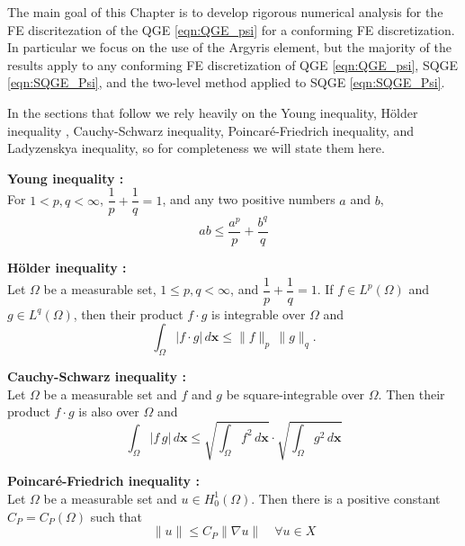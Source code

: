 The main goal of this Chapter is to develop rigorous numerical analysis for
the FE discritezation of the QGE \eqref{eqn:QGE_psi} for a conforming FE
discretization. In particular we focus on the use of the Argyris element, but
the majority of the results apply to any conforming FE discretization of QGE
\eqref{eqn:QGE_psi}, SQGE \eqref{eqn:SQGE_Psi}, and the two-level method applied
to SQGE \eqref{eqn:SQGE_Psi}.

In the sections that follow we rely heavily on the Young inequality, H\"older
inequality , Cauchy-Schwarz inequality, Poincar\'e-Friedrich inequality, and
Ladyzenskya inequality, so for completeness we will state them here.

\begin{definition} \label{def:Young}
  \textbf{Young inequality \cite{Royden2010}:}\\
  For $1 < p,q < \infty$, $\dfrac{1}{p} + \dfrac{1}{q} = 1$, and any two
  positive numbers $a$ and $b$,
  \begin{equation}
    ab \le \frac{a^p}{p} + \frac{b^q}{q}
    \label{eqn:Young}
  \end{equation}
\end{definition}
\begin{definition} \label{def:Holder}
  \textbf{H\"older inequality \cite{Royden2010}:}\\
  Let $\Omega$ be a measurable set, $1\le p,q < \infty$, and $\dfrac{1}{p} +
  \dfrac{1}{q} = 1$. If $f \in L^p(\Omega)$ and $g \in L^q(\Omega)$, then their
  product $f\cdot g$ is integrable over $\Omega$ and
  \begin{equation}
    \int_{\Omega}\! |f\cdot g| \, d\mathbf{x} \le \|f\|_p\, \|g\|_q.
    \label{eqn:Holder}
  \end{equation}
\end{definition}
\begin{definition} \label{def:Cauchy-Schwarz}
  \textbf{Cauchy-Schwarz inequality \cite{Royden2010}:}\\
  Let $\Omega$ be a measurable set and $f$ and $g$ be square-integrable over
  $\Omega$. Then their product $f\cdot g$ is also over $\Omega$ and
  \begin{equation}
    \int_{\Omega}\! |f\,g|\, d\mathbf{x} \le \sqrt{\int_{\Omega}\! f^2 \,
      d\mathbf{x}} \cdot \sqrt{\int_{\Omega}\! g^2 \, d\mathbf{x}}
    \label{eqn:Cauchy}
  \end{equation}

\end{definition}
\begin{definition} \label{def:Poincare}
  \textbf{Poincar\'e-Friedrich inequality \cite{Layton08}:}\\
  Let $\Omega$ be a measurable set and $u \in H^1_0(\Omega)$. Then there is a
  positive constant $C_P = C_P(\Omega)$ such that
  \begin{equation}
    \|u\| \le C_P \|\nabla u\| \quad \forall u \in X
    \label{eqn:Poincare}
  \end{equation}
\end{definition}
